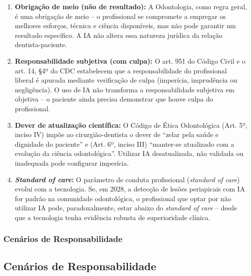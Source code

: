 \begin{enumerate}
  \item \textbf{Obrigação de meio (não de resultado):} A Odontologia, como
    regra geral, é uma obrigação de meio -- o profissional se compromete a
    empregar os melhores esforços, técnica e ciência disponíveis, mas não pode
    garantir um resultado específico. A IA não altera essa natureza jurídica da
    relação dentista-paciente.

  \item \textbf{Responsabilidade subjetiva (com culpa):} O art. 951 do Código
    Civil e o art. 14, §4º do CDC estabelecem que a responsabilidade do
    profissional liberal é apurada mediante verificação de culpa (imperícia,
    imprudência ou negligência). O uso de IA não transforma a responsabilidade
    subjetiva em objetiva -- o paciente ainda precisa demonstrar que houve
    culpa do profissional.

  \item \textbf{Dever de atualização científica:} O Código de Ética Odontológica
    (Art. 5º, inciso IV) impõe ao cirurgião-dentista o dever de ``zelar pela
    saúde e dignidade do paciente'' e (Art. 6º, inciso III) ``manter-se
    atualizado com a evolução da ciência odontológica''. Utilizar IA
    desatualizada, não validada ou inadequada pode configurar imperícia.

  \item \textbf{\textit{Standard of care}:} O parâmetro de conduta profissional
    (\textit{standard of care}) evolui com a tecnologia. Se, em 2028, a
    detecção de lesões periapicais com IA for padrão na comunidade odontológica,
    o profissional que optar por não utilizar IA pode, paradoxalmente, estar
    abaixo do \textit{standard of care} -- desde que a tecnologia tenha
    evidência robusta de superioridade clínica.
\end{enumerate}

\subsubsection{Cenários de Responsabilidade}

\subsection{Cenários de Responsabilidade}

